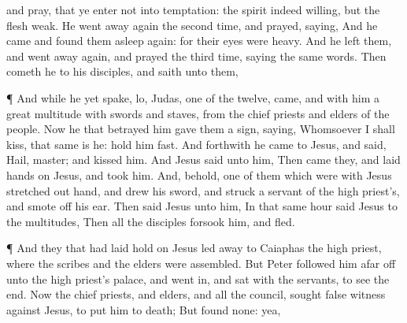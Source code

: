 {{{and
pray,
that
ye enter
not
into
temptation:
the spirit
indeed
{}
willing,
but
the flesh
{}
weak.}}
He went
away
again the second
time, and
prayed,
saying,
{}
And he
came and
found
them
asleep
again:
for
their
eyes
were
heavy.
And he
left
them, and went
away
again, and
prayed the third
time,
saying
the
same
words.
Then cometh
he
to
his
disciples,
and
saith unto
them,
{}
\par }{\PP {}¶
And
while
he
yet
spake,
lo,
Judas,
one of the
twelve,
came,
and
with
him
a
great
multitude
with
swords
and
staves,
from the chief
priests
and
elders of the
people.
Now he that
betrayed
him
gave
them a
sign,
saying,
Whomsoever I shall
kiss, that
same is
he:
hold
him
fast.
And
forthwith he came
to
Jesus, and
said,
Hail,
master;
and
kissed
him.
And
Jesus
said unto
him,
{}
Then came they, and
laid
hands
on
Jesus,
and
took
him.
And,
behold,
one of them which
were
with
Jesus stretched
out
{}
hand, and
drew
his
sword,
and
struck a
servant of the high
priest’s, and smote
off
his
ear.
Then
said
Jesus unto
him,
{}
In that
same
hour
said
Jesus to the
multitudes,
{}
Then
all the
disciples
forsook
him, and
fled.
\par }{\PP {}¶
And they that had laid hold
on
Jesus
led
{}
away
to
Caiaphas the high
priest,
where the
scribes
and the
elders were
assembled.
But
Peter
followed
him
afar
off
unto the high
priest’s
palace,
and
went
in, and
sat
with the
servants, to
see the
end.
Now the chief
priests,
and
elders,
and
all the
council,
sought false
witness
against
Jesus,
to
put
him to
death;
But
found
none: yea,
}
